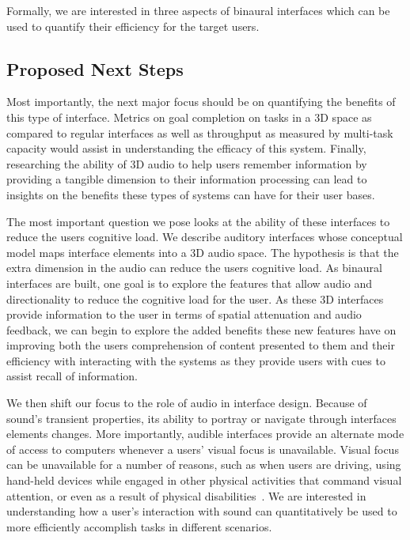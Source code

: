 Formally, we are interested in three aspects of binaural interfaces which can be
used to quantify their efficiency for the target users.

\subsection{                  Proposed Next Steps                             }

Most importantly, the next major focus should be on quantifying the benefits of
this type of interface. Metrics on goal completion on tasks in a 3D space as
compared to regular interfaces as well as throughput as measured by multi-task
capacity would assist in understanding the efficacy of this system. Finally,
researching the ability of 3D audio to help users remember information by
providing a tangible dimension to their information processing can lead to
insights on the benefits these types of systems can have for their user bases.

The most important question we pose looks at the ability of these interfaces to
reduce the users cognitive load. We describe auditory interfaces whose
conceptual model maps interface elements into a 3D audio space. The hypothesis
is that the extra dimension in the audio can reduce the users cognitive load. As
binaural interfaces are built, one goal is to explore the features that allow
audio and directionality to reduce the cognitive load for the user. As these 3D
interfaces provide information to the user in terms of spatial attenuation and
audio feedback, we can begin to explore the added benefits these new features
have on improving both the users comprehension of content presented to them and
their efficiency with interacting with the systems as they provide users with
cues to assist recall of information.

We then shift our focus to the role of audio in interface design. Because of
sound's transient properties, its ability to portray or navigate through
interfaces elements changes. More importantly, audible interfaces provide an
alternate mode of access to computers whenever a users’ visual focus is
unavailable. Visual focus can be unavailable for a number of reasons, such as
when users are driving, using hand-held devices while engaged in other physical
activities that command visual attention, or even as a result of physical
disabilities~\cite{ michelis2008disappearing}. We are interested in
understanding how a user's interaction with sound can quantitatively be used to
more efficiently accomplish tasks in different scenarios.

